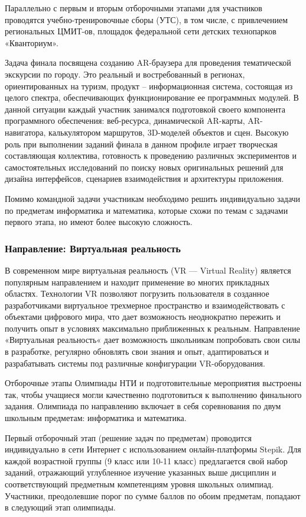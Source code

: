 Параллельно с первым и вторым отборочными этапами для участников проводятся учебно-тренировочные сборы (УТС), в том числе, с привлечением региональных ЦМИТ-ов, площадок федеральной сети детских технопарков «Кванториум». 

Задача финала посвящена созданию AR-браузера для проведения тематической экскурсии по городу. Это реальный и востребованный в регионах, ориентированных на туризм, продукт – информационная система, состоящая из целого спектра, обеспечивающих функционирование ее программных модулей. В данной ситуации каждый участник занимался подготовкой своего компонента программного обеспечения: веб-ресурса, динамической AR-карты, AR-навигатора, калькулятором маршрутов, 3D-моделей объектов и сцен. Высокую роль при выполнении заданий финала в данном профиле играет творческая составляющая коллектива, готовность к проведению различных экспериментов и самостоятельных исследований по поиску новых оригинальных решений для дизайна интерфейсов, сценариев взаимодействия и архитектуры приложения. 

Помимо командной задачи участникам необходимо решить индивидуально задачи по предметам информатика и математика, которые схожи по темам с задачами первого этапа, но имеют более высокую сложность.

\subsubsection*{Направление: Виртуальная реальность}

В современном мире виртуальная реальность (VR — Virtual Reality) является популярным направлением и находит применение во многих прикладных областях. Технологии VR позволяют погрузить пользователя в созданное разработчиками виртуальное трехмерное пространство и взаимодействовать с объектами цифрового мира, что дает возможность неоднократно пережить и получить опыт в условиях максимально приближенных к реальным. Направление «Виртуальная реальность« дает возможность школьникам попробовать свои силы в разработке, регулярно обновлять свои знания и опыт, адаптироваться и разрабатывать системы под различные конфигурации VR-оборудования. 

Отборочные этапы Олимпиады НТИ и подготовительные мероприятия выстроены так, чтобы учащиеся могли качественно подготовиться к выполнению финального задания. Олимпиада по направлению включает в себя соревнования по двум школьным предметам: информатика и математика. 

Первый отборочный этап (решение задач по предметам) проводится индивидуально в сети Интернет с использованием онлайн-платформы Stepik. Для каждой возрастной группы (9 класс или 10-11 класс) предлагается свой набор заданий, отражающий углубленное изучение указанных выше дисциплин и соответствующий предметным компетенциям уровня школьных олимпиад. Участники, преодолевшие порог по сумме баллов по обоим предметам, попадают в следующий этап олимпиады.

